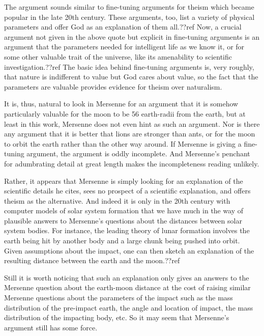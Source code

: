 The argument sounds similar to fine-tuning arguments for theism which became popular in the late 20th century. These
arguments, too, list a variety of physical parameters and offer God as an explanation of them all.??ref 
Now, a crucial
argument not given in the above quote but explicit in fine-tuning arguments is an argument that the 
parameters needed for intelligent life
as we know it, or for some other valuable trait of the universe, like its amenability to scientific investigation.??ref
The basic idea behind fine-tuning arguments is, very roughly, that nature is indifferent to value but God cares 
about value, so the fact that the parameters are valuable provides evidence for theism over naturalism.

It is, thus, natural to look in Mersenne for an argument that it is somehow particularly valuable for the moon to be 56 earth-radii
from the earth, but at least in this work, Mersenne does not even hint as such an argument. Nor is there any argument
that it is better that lions are stronger than ants, or for the moon to orbit the earth rather than
the other way around. If Mersenne is giving a fine-tuning argument, the argument is oddly incomplete. And Mersenne's
penchant for adumbrating detail at great length makes the incompleteness reading unlikely.

Rather, it appears that Mersenne is simply looking for an explanation of the scientific details he cites, sees no
prospect of a scientific explanation, and offers theism as the alternative. And indeed it is only in the 20th century
with computer models of solar system formation that we have much in the way of plausible answers to Mersenne's questions
about the distances between solar system bodies. For instance, the leading theory of lunar formation involves the earth being hit by
another body and a large chunk being pushed into orbit. Given assumptions about the impact, one can then sketch an 
explanation of  the
resulting distance between the earth and the moon.??ref 

Still it is worth noticing that such an explanation only gives an answers to the 
Mersenne question about the earth-moon distance at the cost of raising similar Mersenne questions about the 
parameters of the impact such as the mass distribution of the pre-impact earth, the angle and location of impact, the 
mass distribution of the impacting body, etc. So it may seem that Mersenne's argument still has some force.

